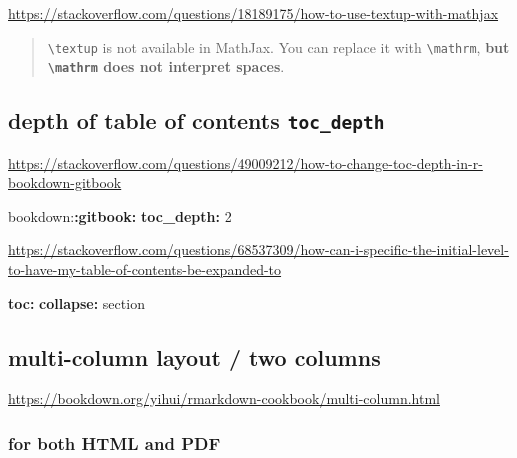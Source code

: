 \documentclass[
]{book}
\newenvironment{Shaded}{\begin{snugshade}}{\end{snugshade}}
\newcommand{\AttributeTok}[1]{\textcolor[rgb]{0.13,0.29,0.53}{#1}}
\newcommand{\DecValTok}[1]{\textcolor[rgb]{0.00,0.00,0.81}{#1}}
\newcommand{\FunctionTok}[1]{\textcolor[rgb]{0.13,0.29,0.53}{\textbf{#1}}}
\newcommand{\KeywordTok}[1]{\textcolor[rgb]{0.13,0.29,0.53}{\textbf{#1}}}
\theoremstyle{definition}
\theoremstyle{definition}
\theoremstyle{definition}
\theoremstyle{definition}
\theoremstyle{remark}
\begin{document}
\url{https://stackoverflow.com/questions/18189175/how-to-use-textup-with-mathjax}

\begin{quote}
\texttt{\textbackslash{}textup} is not available in MathJax. You can replace it with \texttt{\textbackslash{}mathrm}, \textbf{but \texttt{\textbackslash{}mathrm} does not interpret spaces}.
\end{quote}

\hypertarget{depth-of-table-of-contents-toc_depth}{%
\subsection{\texorpdfstring{depth of table of contents \texttt{toc\_depth}}{depth of table of contents toc\_depth}}\label{depth-of-table-of-contents-toc_depth}}

\url{https://stackoverflow.com/questions/49009212/how-to-change-toc-depth-in-r-bookdown-gitbook}

\begin{Shaded}
\begin{Highlighting}[]
\AttributeTok{bookdown:}\FunctionTok{:gitbook}\KeywordTok{:}
\AttributeTok{    }\FunctionTok{toc\_depth}\KeywordTok{:}\AttributeTok{ }\DecValTok{2}
\end{Highlighting}
\end{Shaded}

\url{https://stackoverflow.com/questions/68537309/how-can-i-specific-the-initial-level-to-have-my-table-of-contents-be-expanded-to}

\begin{Shaded}
\begin{Highlighting}[]
\FunctionTok{toc}\KeywordTok{:}
\AttributeTok{  }\FunctionTok{collapse}\KeywordTok{:}\AttributeTok{ section}
\end{Highlighting}
\end{Shaded}

\hypertarget{multi-column}{%
\subsection{multi-column layout / two columns}\label{multi-column}}

\url{https://bookdown.org/yihui/rmarkdown-cookbook/multi-column.html}

\hypertarget{for-both-html-and-pdf}{%
\subsubsection{for both HTML and PDF}\label{for-both-html-and-pdf}}
\end{document}
